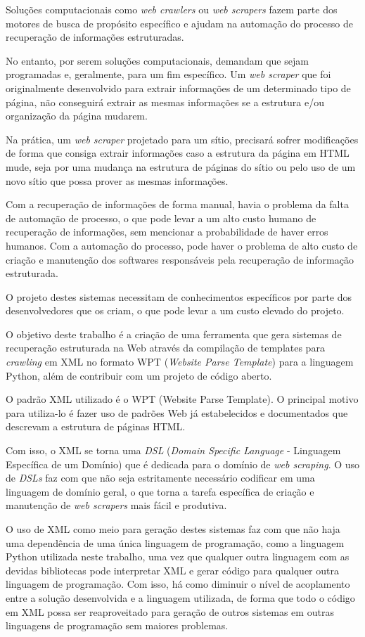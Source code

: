Soluções computacionais como \emph{web crawlers} ou \emph{web scrapers} fazem parte dos motores de busca de propósito específico  e ajudam na automação do processo de recuperação de informações estruturadas. 

No entanto, por serem soluções computacionais, demandam que sejam programadas e, geralmente, para um fim específico. Um \emph{web scraper} que foi originalmente desenvolvido para extrair informações de um determinado tipo de página, não conseguirá extrair as mesmas informações se a estrutura e/ou organização da página mudarem.

Na prática, um \emph{web scraper} projetado para um sítio, precisará sofrer modificações de forma que consiga extrair informações caso a estrutura da página em HTML mude, seja por uma mudança na estrutura de páginas do sítio ou pelo uso de um novo sítio que possa prover as mesmas informações.

Com a recuperação de informações de forma manual, havia o problema da falta de automação de processo, o que pode levar a um alto custo humano de recuperação de informações, sem mencionar a probabilidade de haver erros humanos. Com a automação do processo, pode haver o problema de alto custo de criação e manutenção dos softwares responsáveis pela recuperação de informação estruturada.


O projeto destes sistemas necessitam de conhecimentos específicos por parte dos desenvolvedores que os criam, o que pode levar a um custo elevado do projeto.

O objetivo deste trabalho é a criação de uma ferramenta que gera sistemas de recuperação estruturada na Web através da compilação de templates para \emph{crawling} em XML no formato WPT (\emph{Website Parse Template}) para a linguagem Python, além de contribuir com um projeto de código aberto.

O padrão XML utilizado é o WPT (Website Parse Template)\cite{wpt}. O principal motivo para utiliza-lo é fazer uso de padrões Web já estabelecidos e documentados que descrevam a estrutura de páginas HTML.

Com isso, o XML se torna uma \emph{DSL} (\emph{Domain Specific Language} - Linguagem Específica de um Domínio) que é dedicada para o domínio de \emph{web scraping}. O uso de \emph{DSLs} faz com que não seja estritamente necessário codificar em uma linguagem de domínio geral, o que torna a tarefa específica de criação e manutenção de \emph{web scrapers} mais fácil e produtiva.

O uso de XML como meio para geração destes sistemas faz com que não haja uma dependência de uma única linguagem de programação, como a linguagem Python utilizada neste trabalho, uma vez que qualquer outra linguagem com as devidas bibliotecas pode interpretar XML e gerar código para qualquer outra linguagem de programação. Com isso, há como diminuir o nível de acoplamento entre a solução desenvolvida e a linguagem utilizada, de forma que todo o código em XML possa ser reaproveitado para geração de outros sistemas em outras linguagens de programação sem maiores problemas.

